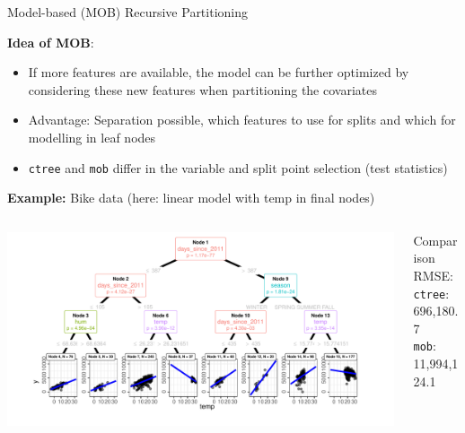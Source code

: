 \documentclass[11pt,compress,t,notes=noshow, aspectratio=169, xcolor=table]{beamer}
\begin{document}
\begin{frame}{Model-based (MOB) Recursive Partitioning }

\vspace{-0.1cm}
\textbf{Idea of MOB}: 

\begin{itemize}
    \item If more features are available, the model can be further optimized by considering these new features when partitioning the covariates 
    \item Advantage: Separation possible, which features to use for splits and which for modelling in leaf nodes
    \item \texttt{ctree} and \texttt{mob} differ in the variable and split point selection (test statistics)
\end{itemize}

\textbf{Example:} Bike data (here: linear model with temp in final nodes)

\begin{columns}[T]
    \begin{column}{0.8\textwidth}
\includegraphics[width = \textwidth]{figure/bike_mob.pdf}
    \end{column}
    \begin{column}{0.2\textwidth}
        \centering
Comparison RMSE: \\
\texttt{ctree}: 696,180.7 \\
\texttt{mob}: 11,994,124.1
    \end{column}
\end{columns}



\end{frame}

\endlecture
\end{document}

